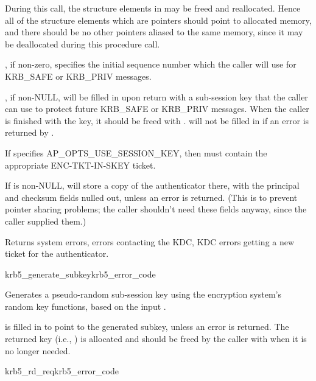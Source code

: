 During this call, the structure elements in  may be
freed and reallocated.  Hence all of the structure elements which are
pointers should point to allocated memory, and there should be no other
pointers aliased to the same memory, since it may be deallocated during
this procedure call.

, if non-zero, specifies the initial sequence number
which the caller will use for KRB_SAFE or KRB_PRIV messages.

, if non-NULL, will be filled in upon return with a 
sub-session key that the caller can use to protect future KRB_SAFE or
KRB_PRIV messages.  When the caller is finished with the key, it should
be freed with .   will
not be filled in if an error is returned by
.

If  specifies AP_OPTS_USE_SESSION_KEY, then
 must contain the appropriate
ENC-TKT-IN-SKEY ticket.

If  is non-NULL, 
will store
a copy of the authenticator there, with the principal and checksum fields
nulled out, unless an error is returned.  (This is to prevent pointer
sharing problems; the caller
shouldn't need these fields anyway, since the caller supplied them.)

Returns system errors, errors contacting the KDC, KDC errors getting
a new ticket for the authenticator.

\begin{funcdecl}{krb5_generate_subkey}{krb5_error_code}{\funcin}
\funcout
{}
\end{funcdecl}

Generates a pseudo-random sub-session key using the encryption system's
random key functions, based on the input .

 is filled in to point to the generated subkey, unless
an error is returned.  The returned key (i.e., ) is
allocated and should be freed by the caller with
 when it is no longer needed.

\begin{funcdecl}{krb5_rd_req}{krb5_error_code}{\funcin}
\funcendfuncarg
{}
\funcinout
{}
\funcout
{}
\end{funcdecl}


